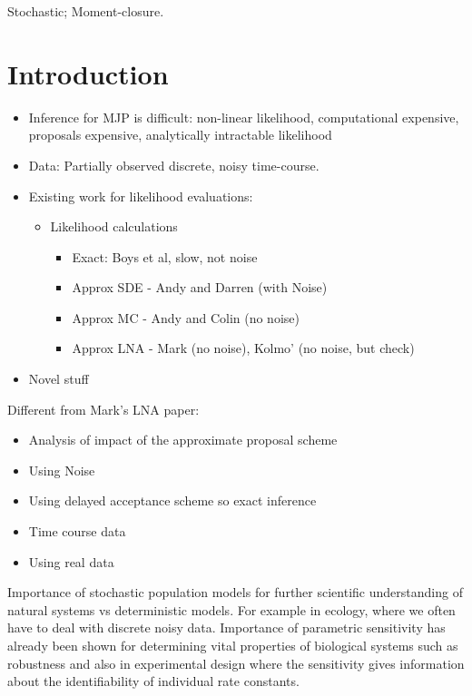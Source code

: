 \documentclass[useAMS,usenatbib,referee]{example/biom}
\begin{document}
\begin{keywords}
Stochastic; Moment-closure.
\end{keywords}

\maketitle

\section{Introduction}
\label{s:intro}

\begin{itemize}
\item Inference for MJP is difficult: non-linear likelihood, computational
  expensive, proposals expensive, analytically intractable likelihood
\item Data: Partially observed discrete, noisy time-course.
\item Existing work for likelihood evaluations: 
\begin{itemize}
\item Likelihood calculations
\begin{itemize}
\item Exact: Boys et al, slow, not noise
\item Approx SDE - Andy and Darren (with Noise)
\item Approx MC - Andy and Colin (no noise)
\item Approx LNA - Mark (no noise), Kolmo' (no noise, but check)
\end{itemize}
\end{itemize}
\item Novel stuff
\end{itemize}
Different from Mark's LNA paper:
\begin{itemize}
\item Analysis of impact of the approximate proposal scheme
\item Using Noise
\item Using delayed acceptance scheme so exact inference
\item Time course data
\item Using real data
\end{itemize}

Importance of stochastic population models for further scientific understanding of natural systems vs deterministic models.  For example in ecology, where we often have to deal with discrete noisy data.  Importance of parametric sensitivity has already been shown for determining vital properties of biological systems such as robustness and also in experimental design where the sensitivity gives information about the identifiability of individual rate constants.
\end{document}
